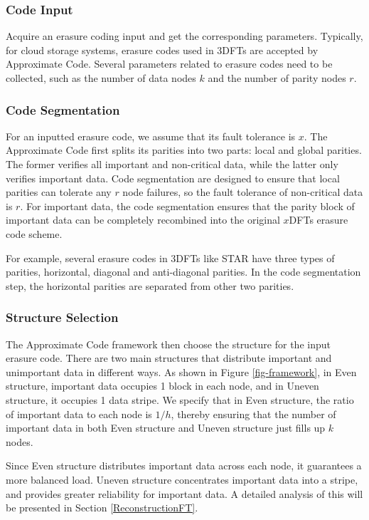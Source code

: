 \documentclass[sigconf]{acmart}
\begin{document}
\subsubsection{Code Input}
Acquire an erasure coding input and get the corresponding parameters. Typically, for cloud storage systems, erasure codes used in 3DFTs are accepted by Approximate Code. Several parameters related to erasure codes need to be collected, such as the number of data nodes $k$ and the number of parity nodes $r$.

\subsubsection{Code Segmentation}
For an inputted erasure code, we assume that its fault tolerance is $x$. The Approximate Code first splits its parities into two parts: local and global parities. The former verifies all important and non-critical data, while the latter only verifies important data. Code segmentation are designed to ensure that local parities can tolerate any $r$ node failures, so the fault tolerance of non-critical data is $r$. For important data, the code segmentation ensures that the parity block of important data can be completely recombined into the original $x$DFTs erasure code scheme.

For example, several erasure codes in 3DFTs like STAR have three types of parities, horizontal, diagonal and anti-diagonal parities. In the code segmentation step, the horizontal parities are separated from other two parities.

\subsubsection{Structure Selection}
The Approximate Code framework then choose the structure for the input erasure code.
There are two main structures that distribute important and unimportant data in different ways.
As shown in Figure \ref{fig-framework}, in Even structure, important data occupies 1 block in each node, and in Uneven structure, it occupies 1 data stripe.
We specify that in Even structure, the ratio of important data to each node is $1/h$, thereby ensuring that the number of important data in both Even structure and Uneven structure just fills up $k$ nodes.

Since Even structure distributes important data across each node, it guarantees a more balanced load. Uneven structure concentrates important data into a stripe, and provides greater reliability for important data. A detailed analysis of this will be presented in Section \ref{ReconstructionFT}.
\end{document}
